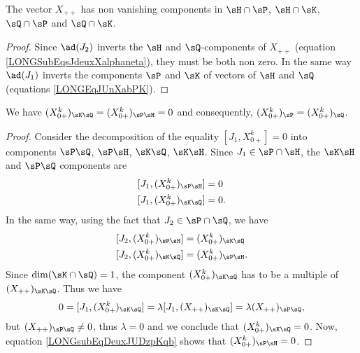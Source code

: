 \begin{corollary}		\label{LONGCorHPHKQPQKXuu}
	The vector $X_{++}$ has non vanishing components in $\sH\cap\sP$, $\sH\cap\sK$, $\sQ\cap\sP$ and $\sQ\cap\sK$.
\end{corollary}

\begin{proof}
	Since $\ad(J_2)$ inverts the $\sH$ and $\sQ$-components of $X_{++}$ (equation \eqref{LONGSubEqsJdeuxXalphaneta}), they must be both non zero. In the same way $\ad(J_1)$ inverts the components $\sP$ and $\sK$ of vectors of $\sH$ and $\sQ$ (equations \eqref{LONGEqJUnXabPK}).
\end{proof}

\begin{lemma}		\label{LONGLEmDesZPP}
	We have	$(X^{k}_{0+})_{\sK\sQ}=(X^{k}_{0+})_{\sP\sH}=0$ and consequently, $(X^k_{0+})_{\sP}=(X^k_{0+})_{\sQ}$.
\end{lemma}

\begin{proof}
	Consider the decomposition of the equality $[J_1,X^{k}_{0+}]=0$ into components $\sP\sQ$, $\sP\sH$, $\sK\sQ$, $\sK\sH$. Since $J_1\in\sP\cap\sH$, the $\sK\sH$ and $\sP\sQ$ components are
	\begin{subequations}
		\begin{align}
			[J_1,(X^{k}_{0+})_{\sP\sH}]&=0\\
			[J_1,(X^{k}_{0+})_{\sK\sQ}]&=0.
		\end{align}
	\end{subequations}
	In the same way, using the fact that $J_2\in\sP\cap\sQ$, we have
	\begin{subequations}	\label{LONGEqDeuxJUDzpKq}
		\begin{align}
			[J_2,(X_{0+}^{k})_{\sP\sH}]&=(X_{0+}^{k})_{\sK\sQ}\\
			[J_2,(X^{k}_{0+})_{\sK\sQ}]&=(X^{k}_{0+})_{\sP\sH}.		\label{LONGsubEqDeuxJUDzpKqb}
		\end{align}
	\end{subequations}
	Since $\dim(\sK\cap\sQ)=1$, the component $(X^{k}_{0+})_{\sK\sQ}$ has to be a multiple of $(X_{++})_{\sK\sQ}$. Thus we have
	\begin{equation}
		0=[J_1,(X^{k}_{0+})_{\sK\sQ}]=\lambda [J_1,(X_{++})_{\sK\sQ}]=\lambda (X_{++})_{\sP\sQ},
	\end{equation}
	but $(X_{++})_{\sP\sQ}\neq 0$, thus $\lambda=0$ and we conclude that $(X_{0+}^{k})_{\sK\sQ}=0$. Now, equation \eqref{LONGsubEqDeuxJUDzpKqb} shows that $(X_{0+}^{k})_{\sP\sH}=0$.
\end{proof}

